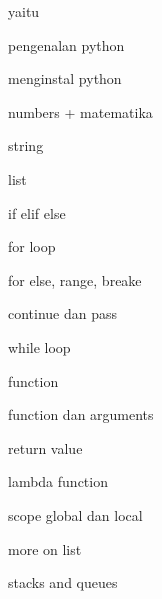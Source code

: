 \noindent 
yaitu \par
\noindent 
pengenalan python \par
\noindent 
menginstal python \par
\noindent 
numbers + matematika \par
\noindent 
string \par
\noindent 
list  \par
\noindent 
if elif else \par
\noindent 
for loop \par
\noindent 
for else, range, breake \par
\noindent 
continue dan pass \par
\noindent 
while loop \par
\vspace{12pt}
\noindent 
function \par
\noindent 
function dan arguments \par
\noindent 
return value \par
\noindent 
lambda function \par
\noindent 
scope global dan local \par
\noindent 
more on list \par
\noindent 
stacks and queues \par
\vspace{12pt}
\vspace{12pt}
\vspace{12pt}
